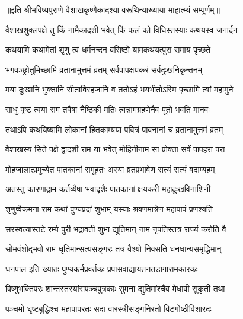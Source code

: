 ॥इति श्रीभविष्यपुराणे वैशाखकृष्णैकादश्या वरूथिन्याख्याया माहात्म्यं सम्पूर्णम्॥


\hyperref[sec:ekadashi_mahatmyam_vrata_raja]{\closesub}
\clearpage

\label{sec:vrata-raja-vaishakha-shukla-mohini}


\twolineshloka
{वैशाखशुक्लपक्षे तु किं नामैकादशी भवेत्}
{किं फलं को विधिस्तस्याः कथयस्व जनार्दन} %


\twolineshloka
{कथयामि कथामेतां शृणु त्वं धर्मनन्दन}
{वसिष्ठो यामकथयत्पुरा रामाय पृच्छते} %


\twolineshloka
{भगवञ्छ्रोतुमिच्छामि व्रतानामुत्तमं व्रतम्}
{सर्वपापक्षयकरं सर्वदुःखनिकृन्तनम्} %

\twolineshloka
{मया दुःखानि भुक्तानि सीताविरहजानि व}
{ततोऽहं भयभीतोऽस्मि पृच्छामि त्वां महामुने} %


\twolineshloka
{साधु पृष्टं त्वया राम तवैषा नैष्ठिकी मतिः}
{त्वन्नामग्रहणेनैव पूतो भवति मानवः} %

\twolineshloka
{तथाऽपि कथयिष्यामि लोकानां हितकाम्यया}
{पवित्रं पावनानां च व्रतानामुत्तमं व्रतम्} %

\twolineshloka
{वैशाखस्य सिते पक्षे द्वादशी राम या भवेत्}
{मोहिनीनाम सा प्रोक्ता सर्वं पापहरा परा} %

\twolineshloka
{मोहजालात्प्रमुच्येत पातकानां समूहतः}
{अस्या व्रतप्रभावेण सत्यं सत्यं वदाम्यहम्} %

\twolineshloka
{अतस्तु कारणाद्राम कर्तव्यैषा भवादृशैः}
{पातकानां क्षयकरी महादुःखविनाशिनी} %

\twolineshloka
{शृणुष्वैकमना राम कथां पुण्यप्रदां शुभाम्}
{यस्याः श्रवणमात्रेण महापापं प्रणश्यति} %

\twolineshloka
{सरस्वत्यास्तटे रम्ये पुरी भद्रावती शुभा}
{द्युतिमान् नाम नृपतिस्तत्र राज्यं करोति वै} %

\twolineshloka
{सोमवंशोद्भवो राम धृतिमान्सत्यसङ्गरः}
{तत्र वैश्यो निवसति धनधान्यसमृद्धिमान्} %

\twolineshloka
{धनपाल इति ख्यातः पुण्यकर्मप्रवर्तकः}
{प्रपासवाद्यायतनतडागारामकारकः} %

\twolineshloka
{विष्णुभक्तिपरः शान्तस्तस्यांसपञ्चपुत्रकाः}
{सुमना द्युतिमांश्चैव मेधावी सुकृती तथा} %

\twolineshloka
{पञ्चमो धृष्टबुद्धिश्च महापापरतः सदा}
{वारस्त्रीसङ्गनिरतो विटगोष्ठीविशारदः} %

